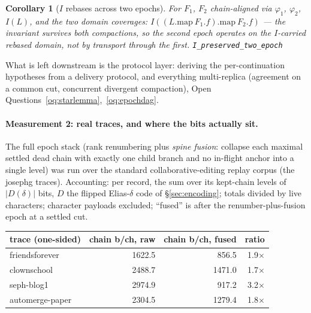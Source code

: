 \documentclass[11pt]{article}
\newtheorem{corollary}[theorem]{Corollary}
\newcommand{\lean}[1]{\texttt{#1}}
\begin{document}
\begin{corollary}[$I$ rebases across two epochs]
\label{cor:itwoepoch}
For $F_1$, $F_2$ chain-aligned via $\varphi_1$, $\varphi_2$, $I(L)$,
and the two domain coverages: $I((L.\mathrm{map}\
F_1.f).\mathrm{map}\ F_2.f)$ --- the invariant survives both
compactions, so the second epoch operates on the $I$-carried rebased
domain, not by transport through the first.
\hfill\lean{I\_preserved\_two\_epoch}
\end{corollary}

\noindent What is left downstream is the protocol layer: deriving the
per-continuation hypotheses from a delivery protocol, and everything
multi-replica (agreement on a common cut, concurrent divergent
compaction), Open Questions~\ref{oq:starlemma},~\ref{oq:epochdag}.

\paragraph{Measurement 2: real traces, and where the bits actually
sit.} The full epoch stack (rank renumbering plus \emph{spine fusion}:
collapse each maximal settled dead chain with exactly one child branch
and no in-flight anchor into a single level) was run over the standard
collaborative-editing replay corpus (the josephg traces). Accounting:
per record, the sum over its kept-chain levels of $|D(\delta)|$ bits,
$D$ the flipped Elias-$\delta$ code of \S\ref{sec:encoding}; totals
divided by live characters; character payloads excluded; ``fused'' is
after the renumber-plus-fusion epoch at a settled cut.

\begin{center}\small
\begin{tabular}{@{}lrrr@{}}
\toprule
trace (one-sided) & chain b/ch, raw & chain b/ch, fused & ratio \\
\midrule
friendsforever & 1622.5 & 856.5 & 1.9$\times$ \\
clownschool & 2488.7 & 1471.0 & 1.7$\times$ \\
seph-blog1 & 2974.9 & 917.2 & 3.2$\times$ \\
automerge-paper & 2304.5 & 1279.4 & 1.8$\times$ \\
\bottomrule
\end{tabular}
\end{center}
\end{document}
